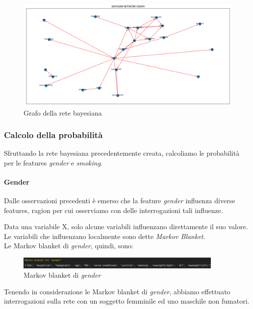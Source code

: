 \documentclass{article}
\begin{document}
\begin{figure}[H]
        \includegraphics[width=16.5cm]{grafoR}
        \centering
        \caption{Grafo della rete bayesiana}
        \centering
\end{figure}
%


\subsubsection{Calcolo della probabilità}

Sfruttando la rete bayesiana precedentemente creata, calcoliamo le probabilità per le features \textit{gender} e \textit{smoking}.

\paragraph{Gender}
Dalle osservazioni precedenti è emerso che la feature \textit{gender} influenza diverse features, ragion per cui osserviamo con delle interrogazioni tali influenze.

\noindent
Data una variabile X, solo alcune variabili influenzano direttamente il suo valore.\\Le variabili che influenzano localmente sono dette \textit{Markov Blanket}.\\
Le Markov blanket di \textit{gender}, quindi, sono:

\begin{figure}[H]
        \includegraphics[width=0.9\textwidth]{MARKgen}
        \centering
        \caption{Markov blanket di \textit{gender}}
        \centering
\end{figure}

Tenendo in considerazione le Markov blanket di \textit{gender}, abbiamo effettuato interrogazioni sulla rete con un soggetto femminile ed uno maschile non fumatori. 
\end{document}
